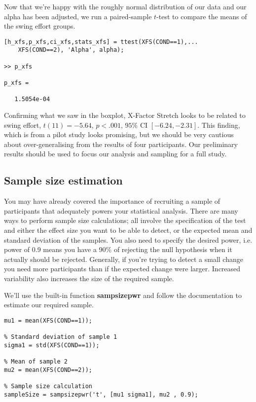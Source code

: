 \documentclass[12pt,a4paper]{article}
\begin{document}
Now that we're happy with the roughly normal distribution of our data and our alpha has been adjusted, we run a paired-sample $t$-test to compare the means of the swing effort groups.

\begin{lstlisting}[style=Matlab-editor]
% Conduct two-sample t-test on XFS
[h_xfs,p_xfs,ci_xfs,stats_xfs] = ttest(XFS(COND==1),...
    XFS(COND==2), 'Alpha', alpha);
    
>> p_xfs

p_xfs =

   1.5054e-04

\end{lstlisting}

Confirming what we saw in the boxplot, X-Factor Stretch looks to be related to swing effort, $t(11) = -5.64$, $p < .001$, $95\%$ CI $[-6.24, -2.31]$.
This finding, which is from a pilot study looks promising, but we should be very cautious about over-generalising from the results of four participants.
Our preliminary results should be used to focus our analysis and sampling for a full study.

\subsection{Sample size estimation}
You may have already covered the importance of recruiting a sample of participants that adequately powers your statistical analysis.
There are many ways to perform sample size calculations; all involve the specification of the test and either the effect size you want to be able to detect, or the expected mean and standard deviation of the samples.
You also need to specify the desired power, i.e. power of 0.9 means you have a 90\% of rejecting the null hypothesis when it actually should be rejected.
Generally, if you're trying to detect a small change you need more participants than if the expected change were larger.
Increased variability also increases the size of the required sample.

We'll use the built-in function \textbf{sampsizepwr} and follow the documentation to estimate our required sample.

\begin{lstlisting}[style=Matlab-editor]
% Mean of sample 1
mu1 = mean(XFS(COND==1));

% Standard deviation of sample 1
sigma1 = std(XFS(COND==1));

% Mean of sample 2
mu2 = mean(XFS(COND==2));

% Sample size calculation
sampleSize = sampsizepwr('t', [mu1 sigma1], mu2 , 0.9);
\end{lstlisting}
\end{document}

